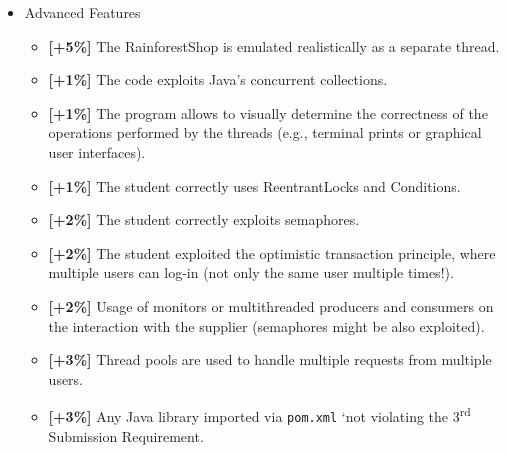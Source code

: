 \documentclass{article}
\begin{document}
\begin{itemize}
\item  Advanced Features
\begin{itemize}
	\item  \textbf{[+5\%]} The RainforestShop is emulated realistically as a separate thread.
	\item  \textbf{[+1\%]} The code exploits Java's concurrent collections.
	\item \textbf{[+1\%]} The program allows to visually determine the correctness of the operations performed by the threads (e.g., terminal prints or graphical user interfaces).
\item \textbf{[+1\%]} The student correctly uses ReentrantLocks and Conditions.
	\item \textbf{[+2\%]} The student correctly exploits semaphores.
	\item \textbf{[+2\%]} The student exploited the optimistic transaction principle, where multiple users can log-in (not only the same user multiple times!).
	\item \textbf{[+2\%]} Usage of monitors or multithreaded producers and consumers on the interaction with the supplier (semaphores might be also exploited).
	\item \textbf{[+3\%]} Thread pools are used to handle multiple requests from multiple users.
	\item \textbf{[+3\%]} Any Java library imported via \texttt{pom.xml} `not violating the 3\textsuperscript{rd} Submission Requirement. 
\end{itemize}
	\end{itemize}


	
\end{document}
